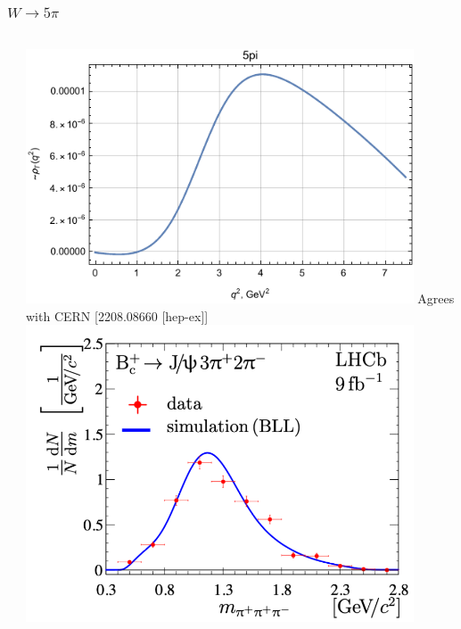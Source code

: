 \documentclass{beamer}
\begin{document}
\begin{frame}
  \frametitle{$W \to   5\pi$}
    \begin{columns}
    \begin{column}{0.5\textwidth}
    \end{column}
    \begin{column}{0.5\textwidth}
      \includegraphics[width=0.9\textwidth]{figs/rhoT_5pi_q2}
      {\tiny Agrees with CERN [2208.08660 [hep-ex]]}
      \includegraphics[width=0.9\textwidth]{figs/2208_08660_Fig4}      
    \end{column}
  \end{columns}

\end{frame}
\end{document}
